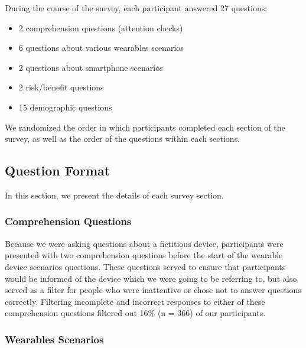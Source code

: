 \documentclass{acm_proc_article-sp}
\begin{document}


During the course of the survey, each participant answered 27 questions:   \\[-.8cm]

\begin{itemize} \itemsep1pt \parskip0pt 
\item 2 comprehension questions (attention checks)
\item 6 questions about various wearables scenarios 
\item 2 questions about smartphone scenarios 
\item 2 risk/benefit questions 
\item 15 demographic questions \\[-.8cm]
\end{itemize}

We randomized the order in which participants completed each section of the survey, as well as the order of the questions within each sections.

\subsection{Question Format} 
In this section, we present the details of each survey section.

\subsubsection{Comprehension Questions}
Because we were asking questions about a fictitious device, participants were presented with two comprehension questions before the start of the wearable device scenarios questions. These questions served to ensure that participants would be informed of the device which we were going to be referring to, but also served as a filter for people who were inattentive or chose not to answer questions correctly. Filtering incomplete and incorrect responses to either of these comprehension questions filtered out 16\% (n = 366) of our participants. 

\subsubsection{Wearables Scenarios}
\end{document}
